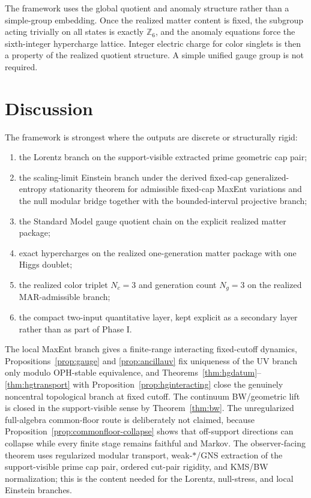 \documentclass[11pt]{article}
\begin{document}
The framework uses the global quotient and anomaly structure rather than a simple-group embedding. Once the realized matter content is fixed, the subgroup acting trivially on all states is exactly $\mathbb Z_6$, and the anomaly equations force the sixth-integer hypercharge lattice. Integer electric charge for color singlets is then a property of the realized quotient structure. A simple unified gauge group is not required.

\section{Discussion}

The framework is strongest where the outputs are discrete or structurally rigid:
\begin{enumerate}[leftmargin=2em]
\item the Lorentz branch on the support-visible extracted prime geometric cap pair;
\item the scaling-limit Einstein branch under the derived fixed-cap generalized-entropy stationarity theorem for admissible fixed-cap MaxEnt variations and the null modular bridge together with the bounded-interval projective branch;
\item the Standard Model gauge quotient chain on the explicit realized matter package;
\item exact hypercharges on the realized one-generation matter package with one Higgs doublet;
\item the realized color triplet \(N_c=3\) and generation count \(N_g=3\) on the realized MAR-admissible branch;
\item the compact two-input quantitative layer, kept explicit as a secondary layer rather than as part of Phase I.
\end{enumerate}

The local MaxEnt branch gives a finite-range interacting fixed-cutoff dynamics, Propositions~\ref{prop:gauge} and \ref{prop:ancillauv} fix uniqueness of the UV branch only modulo OPH-stable equivalence, and Theorems~\ref{thm:hgdatum}--\ref{thm:hgtransport} with Proposition~\ref{prop:hginteracting} close the genuinely noncentral topological branch at fixed cutoff. The continuum BW/geometric lift is closed in the support-visible sense by Theorem~\ref{thm:bw}. The unregularized full-algebra common-floor route is deliberately not claimed, because Proposition~\ref{prop:commonfloor-collapse} shows that off-support directions can collapse while every finite stage remains faithful and Markov. The observer-facing theorem uses regularized modular transport, weak-\(*\)/GNS extraction of the support-visible prime cap pair, ordered cut-pair rigidity, and KMS/BW normalization; this is the content needed for the Lorentz, null-stress, and local Einstein branches.
\end{document}

